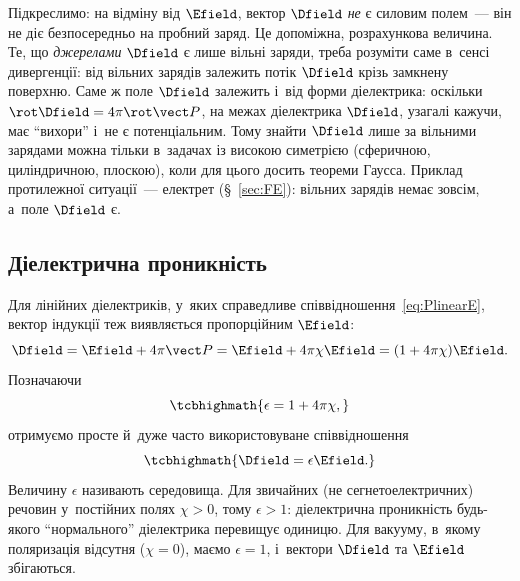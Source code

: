 Підкреслимо: на відміну від $\Efield$, вектор $\Dfield$ \emph{не} є силовим полем~--- він
не діє безпосередньо на пробний заряд. Це допоміжна, розрахункова величина. Те, що
\emph{джерелами} $\Dfield$ є лише вільні заряди, треба розуміти саме в~сенсі дивергенції:
від вільних зарядів залежить потік $\Dfield$ крізь замкнену поверхню. Саме ж поле
$\Dfield$ залежить і~від форми діелектрика: оскільки $\rot\Dfield = 4\pi\rot\vect P$, на
межах діелектрика $\Dfield$, узагалі кажучи, має \enquote{вихори} і~не є потенціальним.
Тому знайти $\Dfield$ лише за вільними зарядами можна тільки в~задачах із високою
симетрією (сферичною, циліндричною, плоскою), коли для цього досить теореми Гаусса.
Приклад протилежної ситуації~--- електрет (\S~\ref{sec:FE}): вільних зарядів немає зовсім,
а~поле $\Dfield$ є.


\subsection*{Діелектрична проникність}


Для лінійних діелектриків, у~яких справедливе співвідношення~\eqref{eq:PlinearE}, вектор
індукції теж виявляється пропорційним $\Efield$:
\begin{equation*}
	\Dfield = \Efield + 4\pi\vect P = \Efield + 4\pi\chi\Efield = (1+4\pi\chi)\Efield.
\end{equation*}
Позначаючи
\begin{equation}\label{eq:eps}
	\tcbhighmath{
		\epsilon = 1 + 4\pi\chi,
	}
\end{equation}
отримуємо просте й~дуже часто використовуване співвідношення
\begin{equation}\label{eq:DepsE}
	\tcbhighmath{
		\Dfield = \epsilon\Efield.
	}
\end{equation}
Величину $\epsilon$ називають  середовища. Для звичайних (не сегнетоелектричних) речовин у~постійних полях
$\chi > 0$, тому $\epsilon > 1$: діелектрична проникність будь-якого
\enquote{нормального} діелектрика перевищує одиницю.
Для вакууму, в~якому поляризація відсутня ($\chi = 0$), маємо $\epsilon = 1$, і~вектори
$\Dfield$ та $\Efield$ збігаються.

